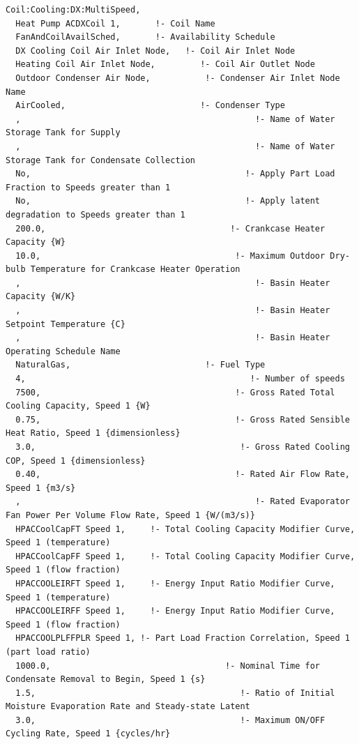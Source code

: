\begin{lstlisting}
Coil:Cooling:DX:MultiSpeed,
  Heat Pump ACDXCoil 1,       !- Coil Name
  FanAndCoilAvailSched,       !- Availability Schedule
  DX Cooling Coil Air Inlet Node,   !- Coil Air Inlet Node
  Heating Coil Air Inlet Node,         !- Coil Air Outlet Node
  Outdoor Condenser Air Node,           !- Condenser Air Inlet Node Name
  AirCooled,                           !- Condenser Type
  ,                                               !- Name of Water Storage Tank for Supply
  ,                                               !- Name of Water Storage Tank for Condensate Collection
  No,                                           !- Apply Part Load Fraction to Speeds greater than 1
  No,                                           !- Apply latent degradation to Speeds greater than 1
  200.0,                                     !- Crankcase Heater Capacity {W}
  10.0,                                       !- Maximum Outdoor Dry-bulb Temperature for Crankcase Heater Operation
  ,                                               !- Basin Heater Capacity {W/K}
  ,                                               !- Basin Heater Setpoint Temperature {C}
  ,                                               !- Basin Heater Operating Schedule Name
  NaturalGas,                           !- Fuel Type
  4,                                             !- Number of speeds
  7500,                                       !- Gross Rated Total Cooling Capacity, Speed 1 {W}
  0.75,                                       !- Gross Rated Sensible Heat Ratio, Speed 1 {dimensionless}
  3.0,                                         !- Gross Rated Cooling COP, Speed 1 {dimensionless}
  0.40,                                       !- Rated Air Flow Rate, Speed 1 {m3/s}
  ,                                               !- Rated Evaporator Fan Power Per Volume Flow Rate, Speed 1 {W/(m3/s)}
  HPACCoolCapFT Speed 1,     !- Total Cooling Capacity Modifier Curve, Speed 1 (temperature)
  HPACCoolCapFF Speed 1,     !- Total Cooling Capacity Modifier Curve, Speed 1 (flow fraction)
  HPACCOOLEIRFT Speed 1,     !- Energy Input Ratio Modifier Curve, Speed 1 (temperature)
  HPACCOOLEIRFF Speed 1,     !- Energy Input Ratio Modifier Curve, Speed 1 (flow fraction)
  HPACCOOLPLFFPLR Speed 1, !- Part Load Fraction Correlation, Speed 1 (part load ratio)
  1000.0,                                   !- Nominal Time for Condensate Removal to Begin, Speed 1 {s}
  1.5,                                         !- Ratio of Initial Moisture Evaporation Rate and Steady-state Latent
  3.0,                                         !- Maximum ON/OFF Cycling Rate, Speed 1 {cycles/hr}

\end{lstlisting}
